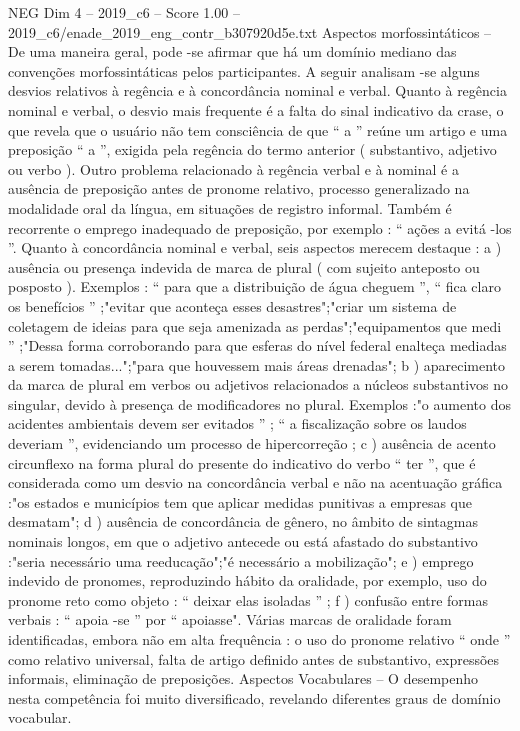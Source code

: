 \begin{textsample}{NEG Dim 4 – 2019\_c6 – Score 1.00 – 2019\_c6/enade\_2019\_eng\_contr\_b307920d5e.txt}
Aspectos morfossintáticos – De uma maneira geral, pode -se afirmar que há um domínio mediano das convenções morfossintáticas pelos participantes.
A seguir analisam -se alguns desvios relativos à regência e à concordância nominal e verbal.
Quanto à regência nominal e verbal, o desvio mais frequente é a falta do sinal indicativo da crase, o que revela que o usuário não tem consciência de que “ a ” reúne um artigo e uma preposição “ a ”, exigida pela regência do termo anterior ( substantivo, adjetivo ou verbo ).
Outro problema relacionado à regência verbal e à nominal é a ausência de preposição antes de pronome relativo, processo generalizado na modalidade oral da língua, em situações de registro informal.
Também é recorrente o emprego inadequado de preposição, por exemplo : “ ações a evitá -los ”.
Quanto à concordância nominal e verbal, seis aspectos merecem destaque : a ) ausência ou presença indevida de marca de plural ( com sujeito anteposto ou posposto ).
Exemplos : “ para que a distribuição de água cheguem ”, “ fica claro os benefícios ” ;"evitar que aconteça esses desastres";"criar um sistema de coletagem de ideias para que seja amenizada as perdas";"equipamentos que medi ” ;"Dessa forma corroborando para que esferas do nível federal enalteça mediadas a serem tomadas...";"para que houvessem mais áreas drenadas"; b ) aparecimento da marca de plural em verbos ou adjetivos relacionados a núcleos substantivos no singular, devido à presença de modificadores no plural.
Exemplos :"o aumento dos acidentes ambientais devem ser evitados ” ; “ a fiscalização sobre os laudos deveriam ”, evidenciando um processo de hipercorreção ; c ) ausência de acento circunflexo na forma plural do presente do indicativo do verbo “ ter ”, que é considerada como um desvio na concordância verbal e não na acentuação gráfica :"os estados e municípios tem que aplicar medidas punitivas a empresas que desmatam"; d ) ausência de concordância de gênero, no âmbito de sintagmas nominais longos, em que o adjetivo antecede ou está afastado do substantivo :"seria necessário uma reeducação";"é necessário a mobilização"; e ) emprego indevido de pronomes, reproduzindo hábito da oralidade, por exemplo, uso do pronome reto como objeto : “ deixar elas isoladas ” ; f ) confusão entre formas verbais : “ apoia -se ” por “ apoiasse".
Várias marcas de oralidade foram identificadas, embora não em alta frequência : o uso do pronome relativo “ onde ” como relativo universal, falta de artigo definido antes de substantivo, expressões informais, eliminação de preposições.
Aspectos Vocabulares – O desempenho nesta competência foi muito diversificado, revelando diferentes graus de domínio vocabular.

\end{textsample}
